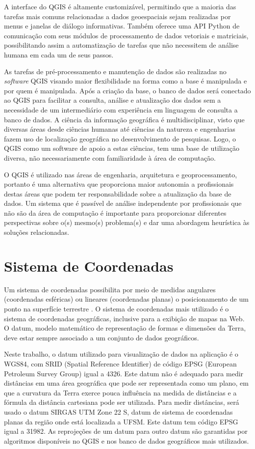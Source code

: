 \documentclass[oneside,openright,12pt]{ufsm_2015} %
\begin{document}
A interface do QGIS é altamente customizável, permitindo que a maioria das tarefas mais comuns relacionadas a dados geoespaciais sejam realizadas por menus e janelas de diálogo informativas. 
Também oferece uma API Python de comunicação com seus módulos de processamento de dados vetoriais e matriciais, possibilitando assim a automatização de tarefas que não necessitem de análise humana em cada um de seus passos.

As tarefas de pré-processamento e manutenção de dados são realizadas no \textit{software} QGIS visando maior flexibilidade na forma como a base é manipulada e por quem é manipulada. Após a criação da base, o banco de dados será conectado ao QGIS para facilitar a consulta, análise e atualização dos dados sem a necessidade de um intermediário com experiência em linguagem de consulta a banco de dados.
A ciência da informação geográfica é multidisciplinar, visto que diversas áreas desde ciências humanas até ciências da natureza e engenharias fazem uso de localização geográfica no desenvolvimento de pesquisas. 
Logo, o QGIS como um software de apoio a estas ciências, tem uma base de utilização diversa, não necessariamente com familiaridade à área de computação.

O QGIS é utilizado nas áreas de engenharia, arquitetura e geoprocessamento, portanto é uma alternativa que proporciona maior autonomia a profissionais destas áreas que podem ter responsabilidade sobre a atualização da base de dados. 
Um sistema que é passível de análise independente por profissionais que não são da área de computação é importante para proporcionar diferentes perspectivas sobre o(s) mesmo(s) problema(s) e dar uma abordagem heurística às soluções relacionadas.


\section{Sistema de Coordenadas}
Um sistema de coordenadas possibilita por meio de medidas angulares (coordenadas esféricas) ou lineares (coordenadas planas) o posicionamento de um ponto na superfície terrestre \cite{fitz:2010}.
O sistema de coordenadas mais utilizado é o sistema de coordenadas geográficas, inclusive para a exibição de mapas na Web. 
O datum, modelo matemático de representação de formas e dimensões da Terra, deve estar sempre associado a um conjunto de dados geográficos.

Neste trabalho, o datum utilizado para visualização de dados na aplicação é o WGS84, com SRID (Spatial Reference Identifier) de código EPSG (European Petroleum Survey Group) igual a 4326.
Este datum não é adequado para medir distâncias em uma área geográfica que pode ser representada como um plano, em que a curvatura da Terra exerce pouca influência na medida de distâncias e a fórmula da distância cartesiana pode ser utilizada. 
Para medir distâncias, será usado o datum SIRGAS UTM Zone 22 S, datum de sistema de coordenadas planas da região onde está localizada a UFSM. Este datum tem código EPSG igual a 31982. As reprojeções de um datum para outro datum são garantidas por algoritmos disponíveis no QGIS e nos banco de dados geográficos mais utilizados.
\end{document}
